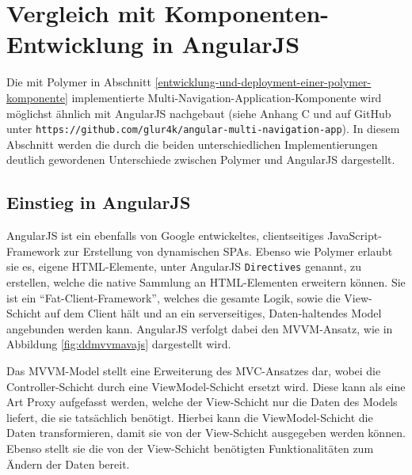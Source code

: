 \section{Vergleich mit Komponenten-Entwicklung in AngularJS}\label{vergleich-mit-komponenten-entwicklung-in-angularjs}

Die mit Polymer in Abschnitt \ref{entwicklung-und-deployment-einer-polymer-komponente} implementierte Multi-Navigation-Application-Kom\-po\-nen\-te wird möglichst ähnlich mit AngularJS nachgebaut (siehe Anhang C und auf GitHub unter \texttt{https://github.com/glur4k/angular-multi-navigation-app}). In diesem Abschnitt werden die durch die beiden unterschiedlichen Implementierungen deutlich gewordenen Unterschiede zwischen Polymer und AngularJS dargestellt.


\subsection{Einstieg in AngularJS}\label{einstieg-in-angularjs}

AngularJS ist ein ebenfalls von Google entwickeltes, clientseitiges JavaScript-Framework zur Erstellung von dynamischen \ac{SPA}s. Ebenso wie Polymer erlaubt sie es, eigene \ac{HTML}-Elemente, unter AngularJS \texttt{Directives} genannt, zu erstellen, welche die native Sammlung an \ac{HTML}-Elementen erweitern können. Sie ist ein ``Fat-Client-Framework'', welches die gesamte Logik, sowie die View-Schicht auf dem Client hält und an ein serverseitiges, Daten-haltendes Model angebunden werden kann. AngularJS verfolgt dabei den \ac{MVVM}-Ansatz, wie in Abbildung \ref{fig:ddmvvmavajs} dargestellt wird. \cite{citeulike:13920434}

Das \ac{MVVM}-Model stellt eine Erweiterung des \ac{MVC}-Ansatzes dar, wobei die Controller-Schicht durch eine ViewModel-Schicht ersetzt wird. Diese kann als eine Art Proxy aufgefasst werden, welche der View-Schicht nur die Daten des Models liefert, die sie tatsächlich benötigt. Hierbei kann die ViewModel-Schicht die Daten transformieren, damit sie von der View-Schicht ausgegeben werden können. Ebenso stellt sie die von der View-Schicht benötigten Funktionalitäten zum Ändern der Daten bereit.


